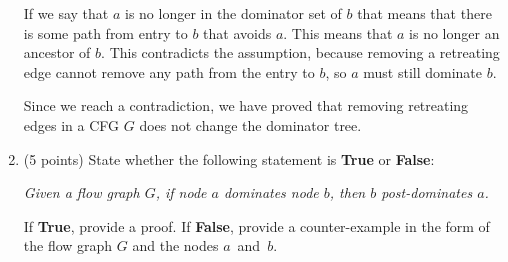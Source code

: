 \documentclass[12pt]{article}
\newcommand{\dom}{\underline{\gg}}
\begin{document}
\begin{enumerate}
\begin{mdframed}
   \vspace{.5em}
   
    If we say that $a$ is no longer in the dominator set of $b$ that means that there is some path from entry to $b$ that avoids $a$. This means that $a$ is no longer an ancestor of $b$. This contradicts the assumption, because removing a retreating edge cannot remove any path from the entry to $b$, so $a$ must still dominate $b$. 

       \vspace{.5em}

    Since we reach a contradiction, we have proved that removing retreating edges in a CFG $G$ does not change the dominator tree.
           \vspace{.5em}

    
  \end{mdframed}
\vspace{.5em}

  \item (5 points) State whether the following statement is \textbf{True} or
  \textbf{False}: 

  \emph{Given a flow graph $G$, if node $a$ dominates node $b$, then $b$ post-dominates $a$.}

  If \textbf{True}, provide a proof. If \textbf{False}, provide a
  counter-example in the form of the flow graph $G$ and the nodes
  $a$~and~$b$.
  \begin{mdframed}

    
    
    
    
    
    

\end{mdframed}
\end{enumerate}
\end{document}
